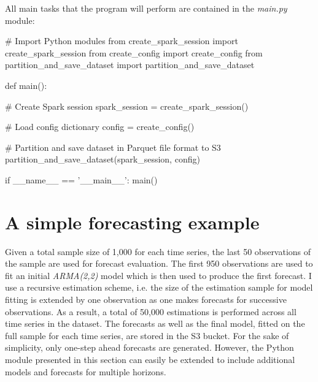 \documentclass[11pt]{article}
\begin{document}
All main tasks that the program will perform are contained in the \emph{main.py} module:

\begin{python}[caption={\emph{main.py}}]
# Import Python modules
from create_spark_session import create_spark_session
from create_config import create_config
from partition_and_save_dataset import partition_and_save_dataset


def main():

    # Create Spark session
    spark_session = create_spark_session()

    # Load config dictionary
    config = create_config()

    # Partition and save dataset in Parquet file format to S3
    partition_and_save_dataset(spark_session, config)

if __name__ == '__main__':
    main()
\end{python}


\section{A simple forecasting example}
\label{sec:forecasting_example}

Given a total sample size of 1,000 for each time series, the last 50 observations of the sample are used for forecast evaluation. The first 950 observations are used to fit an initial \emph{ARMA(2,2)} model which is then used to produce the first forecast. I use a recursive estimation scheme, i.e. the size of the estimation sample for model fitting is extended by one observation as one makes forecasts for successive observations. As a result, a total of 50,000 estimations is performed across all time series in the dataset. The forecasts as well as the final model, fitted on the full sample for each time series, are stored in the S3 bucket. For the sake of simplicity, only one-step ahead forecasts are generated. However, the Python module presented in this section can easily be extended to include additional models and forecasts for multiple horizons.
\end{document}
